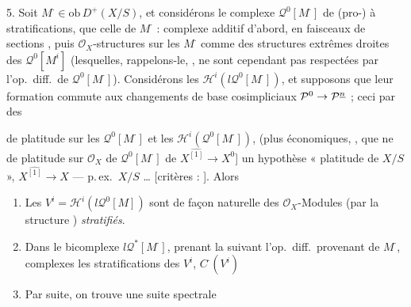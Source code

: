 \documentclass[11pt,a4paper]{article}
\begin{document}

5. Soit  $M^{\cdot} \in \mathrm{ob}\, D^{+}(X/S)$, et
considérons le complexe $\mathcal{Q}^{0}[M^{\cdot}]$ 
\struck{$l\mathcal{Q}^{0}[$} de (pro-)
à stratifications, \ill{} \ill{} \ill{} \ill{} \ill{} \ill{} que celle de
$M^{\cdot}$ : \ill{} \ill{} \ill{} \ill{} \ill{} complexe \ill{} additif
d'abord, en \ill{} \ill{} \ill{} faisceaux de sections
, puis \ill{} \ill{} $\mathcal{O}_X$-structures sur
les $M^{\cdot}$ comme \ill{} des structures extrêmes droites des
$\mathcal{Q}^{0}[M^{i}]$ (lesquelles, rappelons-le, \ill{}, ne sont
cependant pas respectées par l'op.\ diff.\ de $\mathcal{Q}^{0}[M^{\cdot}]$).
Considérons les $\mathcal{H}^{i}(l\mathcal{Q}^{0}[M^{\cdot}])$, et supposons
que leur formation commute aux changements de base \struck{\ill{}}
cosimpliciaux $\mathcal{P}^{0} \to \mathcal{P}^{\uncertain{n}}$ ; ceci
\ill{} \ill{} \ill{} par des 


de  platitude sur les $\mathcal{Q}^{0}[M^{\cdot}]$ et les
$\mathcal{H}^{i}(\mathcal{Q}^{0}[M^{\cdot}])$, \struck{\ill{}} \ill{} (plus
économiques, \ill{} \ill{}, \ill{} que \ill{} ne \ill{} \ill{} \ill{}
\ill{} de platitude sur $\mathcal{O}_X$ de $\mathcal{Q}^{0}[M^{\cdot}]$
\ill{} \ill{} de $X^{\widehat{[1]}} \to X^{0}$] \ill{} un hypothèse
\ill{} « platitude  de $X/S$ », \ill{} \ill{}
$X^{\widehat{[1]}} \to X$ --- p.\,ex.\ $X/S$ 
\ldots{} [critères : ]. Alors
\begin{enumerate}
\item[1°)] Les $V^{i} = \mathcal{H}^{i}(l\mathcal{Q}^{0}[M])$ sont de
\ill{} \struck{\ill{}} façon naturelle des $\mathcal{O}_X$-Modules (par la
structure ) \emph{stratifiés}.
\item[2°)] Dans le bicomplexe $l\mathcal{Q}^{*}[M^{\cdot}]$, prenant la
  suivant l'op.\ diff.\
provenant de $M^{\cdot}$, \ill{} \ill{} \struck{\ill{}} complexes
\ill{} \ill{} \uncertain{fournissant} les stratifications
\struck{\ill{}} des $V^{i}$, $C^{\cdot}(V^{i})$ \ill{} \ill{}
\item[3°)] Par suite, on trouve une suite spectrale
\end{enumerate}
\end{document}
